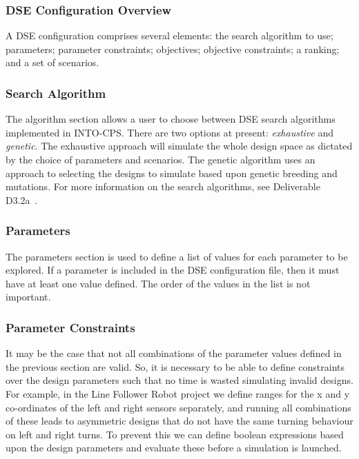\subsubsection{DSE Configuration Overview}\label{sec:dse:overview}

A DSE configuration comprises several elements: the search algorithm to use; parameters; parameter constraints; objectives; objective constraints; a ranking; and a set of scenarios.


\subsubsection*{Search Algorithm}\label{sec:dse:overview:algorithm}

The algorithm section allows a user to choose between DSE search algorithms implemented in INTO-CPS. There are two options at present: \textit{exhaustive} and \textit{genetic}. The exhaustive approach will simulate the whole design space as dictated by the choice of parameters and scenarios. The genetic algorithm uses an approach to selecting the designs to simulate based upon genetic breeding and mutations. For more information on the search algorithms, see Deliverable D3.2a~\cite{INTOCPSD3.2a}.

\subsubsection*{Parameters}\label{sec:dse:overview:parameters}

The parameters section is used to define a list of values for each parameter to be explored.   If a parameter is included in the DSE configuration file, then it must have at least one value defined.  The order of the values in the list is not important. 

\subsubsection*{Parameter Constraints}\label{sec:dse:overview:parameterconstraints}
It may be the case that not all combinations of the parameter values defined in the previous section are valid.
%
So, it is necessary to be able to define constraints over the design parameters such that no time is wasted simulating invalid designs.  For example, in the Line Follower Robot project \cite{INTOCPSD3.6} we define ranges for the x and y co-ordinates of the left and right sensors separately, and running all combinations of these leads to asymmetric designs that do not have the same turning behaviour on left and right turns.  To prevent this we can define boolean expressions based upon the design parameters and evaluate these before a simulation is launched.

